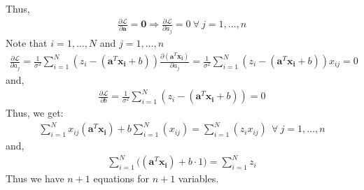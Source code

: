 \documentclass[11pt, fleqn]{article}
\begin{document}
Thus,
\begin{equation*}
    \begin{split}
        \frac{\partial \mathcal{L}}{\partial \mathbf{a}} = \mathbf{0} \Rightarrow \frac{\partial \mathcal{L}}{\partial a_j} = 0 \ \forall \ j = 1,\ldots,n
    \end{split}
\end{equation*}
Note that $i = 1,\ldots,N$ and $j = 1,\ldots,n$\\
\begin{equation*}
    \begin{split}
        \frac{\partial \mathcal{L}}{\partial a_j} = \frac{1}{{\sigma^2}}\sum_{i=1}^{N} (z_i - (\mathbf{a}^T\mathbf{x_i} + b))\frac{\partial (\mathbf{a}^T\mathbf{x_i})}{\partial a_j} = \frac{1}{{\sigma^2}}\sum_{i=1}^{N} (z_i - (\mathbf{a}^T\mathbf{x_i} + b))x_{ij} = 0
    \end{split}
\end{equation*}
and,
\begin{equation*}
    \begin{split}
        \frac{\partial \mathcal{L}}{\partial b} = \frac{1}{{\sigma^2}}\sum_{i=1}^{N} (z_i - (\mathbf{a}^T\mathbf{x_i} + b)) = 0
    \end{split}
\end{equation*}
Thus, we get:
\begin{equation}
    \label{set1}
    \begin{split}
        \boxed{\sum_{i=1}^{N} x_{ij}(\mathbf{a}^T\mathbf{x_i}) + b\sum_{i=1}^{N}(x_{ij}) = \sum_{i=1}^{N} (z_ix_{ij}) \  \ \forall \ j = 1,\ldots,n}
    \end{split}
\end{equation}
and,
\begin{equation}
    \label{set2}
    \begin{split}
        \boxed{\sum_{i=1}^{N}\big((\mathbf{a}^T\mathbf{x_i}) + b\cdot1 \big) = \sum_{i=1}^{N} z_i}
    \end{split}
\end{equation}
Thus we have $n+1$ equations for $n+1$ variables.
\end{document}
